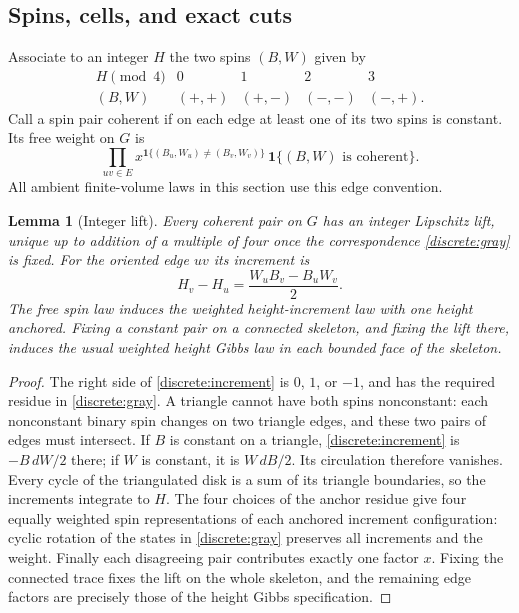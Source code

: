 \documentclass[11pt]{article}
\newcommand{\ind}{\mathbf 1}
\newtheorem{lemma}[theorem]{Lemma}
\theoremstyle{definition}
\theoremstyle{remark}
\numberwithin{equation}{section}
\begin{document}
\subsection{Spins, cells, and exact cuts}

Associate to an integer $H$ the two spins $(B,W)$ given by
\begin{equation}\label{discrete:gray}
\begin{array}{c|cccc}
H\pmod4&0&1&2&3\\ \hline
(B,W)&(+,+)&(+,-)&(-,-)&(-,+).
\end{array}
\end{equation}
Call a spin pair coherent if on each edge at least one of its two spins is
constant. Its free weight on $G$ is
\begin{equation}\label{discrete:pair-weight}
 \prod_{uv\in E}x^{\ind\{(B_u,W_u)\ne(B_v,W_v)\}}\,
 \ind\{(B,W)\text{ is coherent}\}.
\end{equation}
All ambient finite-volume laws in this section use this edge convention.

\begin{lemma}[Integer lift]\label{lem:spin-lift}
Every coherent pair on $G$ has an integer Lipschitz lift, unique up to addition
of a multiple of four once the correspondence \eqref{discrete:gray} is fixed.
For the oriented edge $uv$ its increment is
\begin{equation}\label{discrete:increment}
 H_v-H_u=\frac{W_uB_v-B_uW_v}{2}.
\end{equation}
The free spin law induces the weighted height-increment law with one height
anchored. Fixing a constant pair on a connected skeleton, and fixing the lift
there, induces the usual weighted height Gibbs law in each bounded face of
the skeleton.
\end{lemma}
\begin{proof}
The right side of \eqref{discrete:increment} is $0$, $1$, or $-1$, and has
the required residue in \eqref{discrete:gray}. A triangle cannot have both
spins nonconstant: each nonconstant binary spin changes on two triangle
edges, and these two pairs of edges must intersect. If $B$ is constant on a
triangle, \eqref{discrete:increment} is $-B\,dW/2$ there; if $W$ is constant,
it is $W\,dB/2$. Its circulation therefore vanishes. Every cycle of the
triangulated disk is a sum of its triangle boundaries, so the increments
integrate to $H$. The four choices of the anchor residue give four equally
weighted spin representations of each anchored increment configuration:
cyclic rotation of the states in \eqref{discrete:gray} preserves all
increments and the weight. Finally each disagreeing pair contributes exactly
one factor $x$. Fixing the connected trace fixes the lift on the whole
skeleton, and the remaining edge factors are precisely those of the height
Gibbs specification.
\end{proof}
\end{document}
